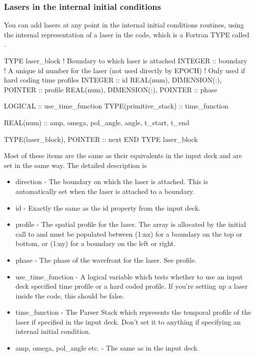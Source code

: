 \subsubsection{Lasers in the internal initial conditions}
You can add lasers at any point in the internal initial conditions routines,
using the internal representation of a laser in the code, which is a Fortran
TYPE called .
\begin{boxverbatim}
  TYPE laser_block
    ! Boundary to which laser is attached
    INTEGER :: boundary
    ! A unique id number for the laser (not used directly by EPOCH)
    ! Only used if hard coding time profiles
    INTEGER :: id
    REAL(num), DIMENSION(:), POINTER :: profile
    REAL(num), DIMENSION(:), POINTER :: phase

    LOGICAL :: use_time_function
    TYPE(primitive_stack) :: time_function

    REAL(num) :: amp, omega, pol_angle, angle, t_start, t_end

    TYPE(laser_block), POINTER :: next
  END TYPE laser_block
\end{boxverbatim}
Most of these items are the same as their equivalents in the input deck and
are set in the same way. The detailed description is
\begin{itemize}
\item direction - The boundary on which the laser is attached. This is
  automatically set when the laser is attached to a boundary.
\item id - Exactly the same as the id property from the input deck.
\item profile - The spatial profile for the laser. The array is allocated by
  the initial call to  and must be populated between
  (1:nx) for a boundary on the top or bottom, or (1:ny) for a boundary on the
  left or right.
\item phase - The phase of the wavefront for the laser. See profile.
\item use\_time\_function - A logical variable which tests whether to use an
  input deck specified time profile or a hard coded profile. If you're setting
  up a laser inside the code, this should be false.
\item time\_function - The Parser Stack which represents the temporal profile of
  the laser if specified in the input deck. Don't set it to anything if
  specifying an internal initial condition.
\item amp, omega, pol\_angle etc. - The same as in the input deck.
\end{itemize}

